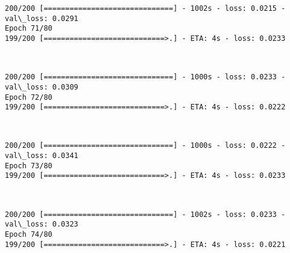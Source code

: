 \documentclass[11pt]{article}
\begin{document}
    \begin{Verbatim}[commandchars=\\\{\}]
200/200 [==============================] - 1002s - loss: 0.0215 - val\_loss: 0.0291
Epoch 71/80
199/200 [============================>.] - ETA: 4s - loss: 0.0233
    \end{Verbatim}

    \begin{center}
    \end{center}
    { \hspace*{\fill} \\}
    
    \begin{Verbatim}[commandchars=\\\{\}]
200/200 [==============================] - 1000s - loss: 0.0233 - val\_loss: 0.0309
Epoch 72/80
199/200 [============================>.] - ETA: 4s - loss: 0.0222
    \end{Verbatim}

    \begin{center}
    \end{center}
    { \hspace*{\fill} \\}
    
    \begin{Verbatim}[commandchars=\\\{\}]
200/200 [==============================] - 1000s - loss: 0.0222 - val\_loss: 0.0341
Epoch 73/80
199/200 [============================>.] - ETA: 4s - loss: 0.0233
    \end{Verbatim}

    \begin{center}
    \end{center}
    { \hspace*{\fill} \\}
    
    \begin{Verbatim}[commandchars=\\\{\}]
200/200 [==============================] - 1002s - loss: 0.0233 - val\_loss: 0.0323
Epoch 74/80
199/200 [============================>.] - ETA: 4s - loss: 0.0221
    \end{Verbatim}

    \begin{center}
    \end{center}
    { \hspace*{\fill} \\}
    
\end{document}
